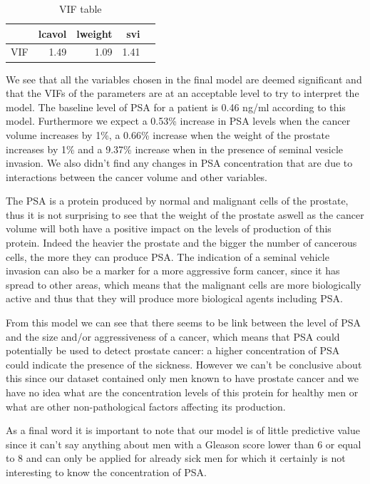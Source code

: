 \documentclass[10pt]{article}
\begin{document}
\begin{table}[ht]
\centering
\caption{VIF table} \label{summary}
\begin{tabular}{rrrrr}
  \hline
 & lcavol & lweight & svi \\ 
  \hline
VIF & 1.49 & 1.09 & 1.41 \\ 
   \hline
\end{tabular}
\end{table}

We see that all the variables chosen in the final model are deemed significant and that the VIFs of the parameters are at an acceptable level to try to interpret the model. The baseline level of PSA for a patient is 0.46 ng/ml according to this model. Furthermore we expect a 0.53\% increase in PSA levels when the cancer volume increases by 1\%, a 0.66\% increase when the weight of the prostate increases by 1\% and a 9.37\%  increase when in the presence of seminal vesicle invasion. We also didn't find any changes in PSA concentration that are due to interactions between the cancer volume and other variables.

The PSA is a protein produced by normal and malignant cells of the prostate, thus it is not surprising to see that the weight of the prostate aswell as the cancer volume will both have a positive impact on the levels of production of this protein. Indeed the heavier the prostate and the bigger the number of cancerous cells, the more they can produce PSA. The indication of a seminal vehicle invasion can also be a marker for a more aggressive form cancer, since it has spread to other areas, which means that the malignant cells are more biologically active and thus that they will produce more biological agents including PSA.

From this model we can see that there seems to be link between the level of PSA and the size and/or aggressiveness of a cancer, which means that PSA could potentially be used to detect prostate cancer: a higher concentration of PSA could indicate the presence of the sickness. However we can't be conclusive about this since our dataset contained only men known to have prostate cancer and we have no idea what are the concentration levels of this protein for healthy men or what are other non-pathological factors affecting its production.

As a final word it is important to note that our model is of little predictive value since it can't say anything about men with a Gleason score lower than 6 or equal to 8 and can only be applied for already sick men for which it certainly is not interesting to know the concentration of PSA.
\end{document}

